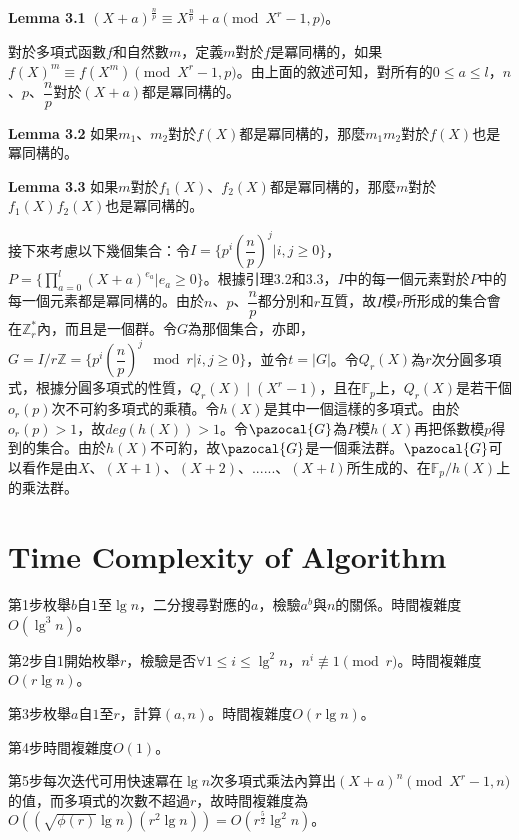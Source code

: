 \documentclass{article}
\newcommand{\nequiv}{\not\equiv}
\newcommand{\Gc}{\pazocal{G}}
\begin{document}
\begin{mdframed}
\noindent\textbf{Lemma 3.1} $(X+a)^{\frac{n}{p}}\equiv X^{\frac{n}{p}}+a\pmod{X^r-1, p}$。
\end{mdframed}

    對於多項式函數$f$和自然數$m$，定義$m$對於$f$是冪同構的，如果$f(X)^m\equiv f(X^m)\pmod{X^r-1, p}$。由上面的敘述可知，對所有的$0\leq a\leq l$，$n$、$p$、$\dfrac{n}{p}$對於$(X+a)$都是冪同構的。

\begin{mdframed}
\noindent\textbf{Lemma 3.2} 如果$m_1$、$m_2$對於$f(X)$都是冪同構的，那麼$m_1m_2$對於$f(X)$也是冪同構的。
\end{mdframed}

\begin{mdframed}
\noindent\textbf{Lemma 3.3} 如果$m$對於$f_1(X)$、$f_2(X)$都是冪同構的，那麼$m$對於$f_1(X)f_2(X)$也是冪同構的。
\end{mdframed}

    接下來考慮以下幾個集合：令$I=\{p^i(\dfrac{n}{p})^j|i, j\geq 0\}$，$P=\{\prod\limits_{a=0}^{l}(X+a)^{e_a}|e_a\geq 0\}$。根據引理3.2和3.3，$I$中的每一個元素對於$P$中的每一個元素都是冪同構的。由於$n$、$p$、$\dfrac{n}{p}$都分別和$r$互質，故$I$模$r$所形成的集合會在$\mathbb{Z}_r^*$內，而且是一個群。令$G$為那個集合，亦即，$G=I/r\mathbb{Z}=\{p^i(\dfrac{n}{p})^j \mod r|i, j\geq 0\}$，並令$t=|G|$。令$Q_r(X)$為$r$次分圓多項式，根據分圓多項式的性質，$Q_r(X)\mid (X^r-1)$，且在$\mathbb{F}_p$上，$Q_r(X)$是若干個$o_r(p)$次不可約多項式的乘積。令$h(X)$是其中一個這樣的多項式。由於$o_r(p)>1$，故$deg(h(X))>1$。令$\Gc$為$P$模$h(X)$再把係數模$p$得到的集合。由於$h(X)$不可約，故$\Gc$是一個乘法群。$\Gc$可以看作是由$X$、$(X+1)$、$(X+2)$、......、$(X+l)$所生成的、在$\mathbb{F}_p/h(X)$上的乘法群。

\section{Time Complexity of Algorithm}

    第1步枚舉$b$自$1$至$\lg n$，二分搜尋對應的$a$，檢驗$a^b$與$n$的關係。時間複雜度$O(\lg^3n)$。

    第2步自1開始枚舉$r$，檢驗是否$\forall 1\leq i\leq\lg^2n$，$n^i\nequiv 1\pmod{r}$。時間複雜度$O(r\lg n)$。

    第3步枚舉$a$自$1$至$r$，計算$(a,n)$。時間複雜度$O(r\lg n)$。

    第4步時間複雜度$O(1)$。

    第5步每次迭代可用快速冪在$\lg n$次多項式乘法內算出$(X+a)^n\pmod{X^r-1, n}$的值，而多項式的次數不超過$r$，故時間複雜度為$O((\sqrt{\phi(r)}\lg n)(r^2\lg n))=O(r^{\frac{5}{2}}\lg^2n)$。
\end{document}
